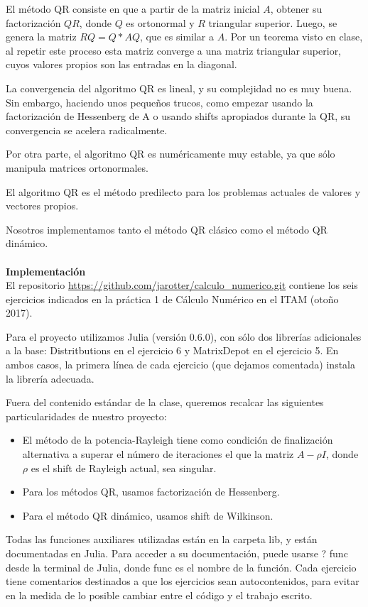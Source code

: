 \documentclass[11pt]{article}
\begin{document}
El método QR consiste en que a partir de la matriz inicial $A$, obtener su factorización $QR$, donde $Q$ es ortonormal y $R$ triangular superior. Luego, se genera la matriz $RQ=Q*AQ$, que es similar a $A$. Por un teorema visto en clase, al repetir este proceso esta matriz converge a una matriz triangular superior, cuyos valores propios son las entradas en la diagonal.



La convergencia del algoritmo QR es lineal, y su complejidad no es muy buena. Sin embargo, haciendo unos pequeños trucos, como empezar usando la factorización de Hessenberg de A o usando shifts apropiados durante la QR, su convergencia se acelera radicalmente.



Por otra parte, el algoritmo QR es numéricamente muy estable, ya que sólo manipula matrices ortonormales.



El algoritmo QR es el método predilecto para los problemas actuales de valores y vectores propios.



Nosotros implementamos tanto el método QR clásico como el método QR dinámico.
\\
\\

\noindent
\newpage
\noindent
\textbf{\LARGE{Implementación}}
\\
El repositorio \url{https://github.com/jarotter/calculo_numerico.git} contiene los
 seis ejercicios indicados en la práctica 1 de Cálculo Numérico en el ITAM
 (otoño 2017).

Para el proyecto utilizamos Julia (versión 0.6.0), con sólo dos librerías adicionales a la base:
Distritbutions en el ejercicio 6 y MatrixDepot en el ejercicio 5. En ambos
casos, la primera línea de cada ejercicio (que dejamos comentada) instala la
librería adecuada.

Fuera del contenido estándar de la clase, queremos recalcar las siguientes
particularidades de nuestro proyecto:

\begin{itemize}
\item El método de la potencia-Rayleigh tiene como condición de finalización
alternativa a superar el número de iteraciones el que la matriz
$A-\rho I$, donde $\rho$ es el shift de Rayleigh actual, sea singular.

\item Para los métodos QR, usamos factorización de Hessenberg.

\item Para el método QR dinámico, usamos shift de Wilkinson.
\end{itemize}
Todas las funciones auxiliares utilizadas están en la carpeta lib, y están
documentadas en Julia. Para acceder a su documentación, puede usarse ? func
desde la terminal de Julia, donde func es el nombre de la función. Cada
ejercicio tiene comentarios destinados a que los ejercicios sean autocontenidos,
para evitar en la medida de lo posible cambiar entre el código y el
trabajo escrito.
\end{document}

